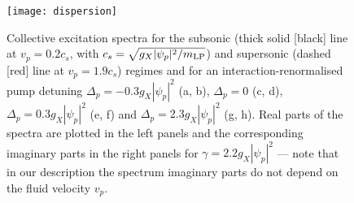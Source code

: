 \begin{figure}[tb]\centering
\texttt{[image: dispersion]} %
\caption{
%
Collective excitation spectra for the subsonic (thick
solid [black] line at $v_p=0.2 c_s$, with $c_s=\sqrt{g_X|\psi_p|^2/m_{\text{LP}}}$)
and supersonic (dashed [red] line at $v_p=1.9 c_s$) regimes and for an
interaction-renormalised pump detuning $\Delta_p=-0.3 g_X|\psi_p|^2$ (a,
b), $\Delta_p = 0$ (c, d), $\Delta_p=0.3g_X|\psi_p|^2$ (e, f) and
$\Delta_p=2.3g_X|\psi_p|^2$ (g, h). Real parts of the spectra are
plotted in the left panels and the corresponding imaginary parts in
the right panels for $\gamma=2.2 g_X|\psi_p|^2$ --- note that in our
description the spectrum imaginary parts do not depend on the fluid
velocity $v_p$.
%
}\label{fig:spect_pmp_only}
\end{figure}
%


